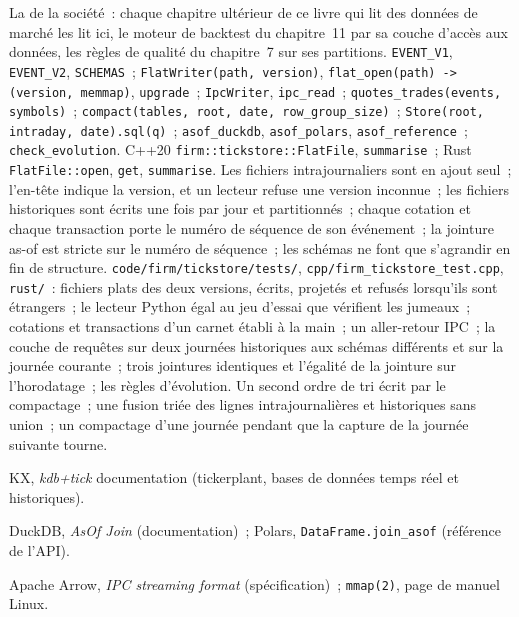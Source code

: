 \begin{build}
 La  de la société~: chaque chapitre ultérieur de ce livre qui lit des données de marché les lit ici, le moteur de backtest
du chapitre~11 par sa couche d'accès aux données, les règles de qualité du chapitre~7 sur ses partitions.
 \texttt{EVENT\_V1}, \texttt{EVENT\_V2}, \texttt{SCHEMAS}~; \texttt{FlatWriter(path, version)},
\texttt{flat\_open(path) -> (version, memmap)}, \texttt{upgrade}~; \texttt{IpcWriter}, \texttt{ipc\_read}~;
\texttt{quotes\_trades(events, symbols)}~; \texttt{compact(tables, root, date, row\_group\_size)}~;
\texttt{Store(root, intraday, date).sql(q)}~; \texttt{asof\_duckdb}, \texttt{asof\_polars}, \texttt{asof\_reference}~; \texttt{check\_evolution}. C++20
\texttt{firm::tickstore::FlatFile}, \texttt{summarise}~; Rust \texttt{FlatFile::open}, \texttt{get}, \texttt{summarise}.
 Les fichiers intrajournaliers sont en ajout seul~; l'en-tête indique la version, et un lecteur refuse une version inconnue~; les
fichiers historiques sont écrits une fois par jour et partitionnés~; chaque cotation et chaque transaction porte le numéro de séquence de son événement~; la
jointure as-of est stricte sur le numéro de séquence~; les schémas ne font que s'agrandir en fin de structure.
 \texttt{code/firm/tickstore/tests/}, \texttt{cpp/firm\_tickstore\_test.cpp}, \texttt{rust/}~: fichiers plats des
deux versions, écrits, projetés et refusés lorsqu'ils sont étrangers~; le lecteur Python égal au jeu d'essai que vérifient les jumeaux~; cotations et transactions
d'un carnet établi à la main~; un aller-retour IPC~; la couche de requêtes sur deux journées historiques aux schémas différents et sur la journée courante~;
trois jointures identiques et l'égalité de la jointure sur l'horodatage~; les règles d'évolution.
 Un second ordre de tri écrit par le compactage~; une fusion triée des lignes intrajournalières et historiques sans union~;
un compactage d'une journée pendant que la capture de la journée suivante tourne.
\end{build}

\begin{omsources}
\item KX, \emph{kdb+tick} documentation (tickerplant, bases de données temps réel et historiques).
\item DuckDB, \emph{AsOf Join} (documentation)~; Polars, \texttt{DataFrame.join\_asof} (référence de l'API).
\item Apache Arrow, \emph{IPC streaming format} (spécification)~; \texttt{mmap(2)}, page de manuel Linux.
\end{omsources}

